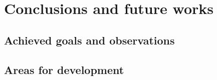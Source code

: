 
\chapter{Conclusions and future works} \label{chap:conclusions}

\section{Achieved goals and observations}

\section{Areas for development}

